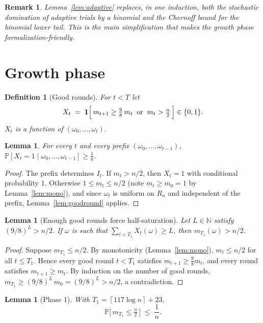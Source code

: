 \documentclass[11pt]{article}
\newtheorem{lemma}[theorem]{Lemma}
\newtheorem{definition}[theorem]{Definition}
\newtheorem{remark}[theorem]{Remark}
\renewcommand{\Pr}{\mathbb{P}}
\newcommand{\N}{\mathbb{N}}
\newcommand{\ceil}[1]{\left\lceil #1 \right\rceil}
\begin{document}
\begin{remark}
Lemma~\ref{lem:adaptive} replaces, in one induction, both the stochastic
domination of adaptive trials by a binomial and the Chernoff bound for the
binomial lower tail.  This is the main simplification that makes the growth
phase formalization-friendly.
\end{remark}

\section{Growth phase}\label{sec:growth}

\begin{definition}[Good rounds]\label{def:good}
For $t < T$ let
\[
  X_t \;=\; \mathbf{1}\Bigl[\, m_{t+1} \ge \tfrac98\, m_t
  \;\;\text{or}\;\; m_t > \tfrac n2 \,\Bigr] \in \{0,1\}.
\]
$X_t$ is a function of $(\omega_0,\dots,\omega_t)$.
\end{definition}

\begin{lemma}\label{lem:goodprob}
For every $t$ and every prefix $(\omega_0,\dots,\omega_{t-1})$,
$\Pr[X_t = 1 \mid \omega_0,\dots,\omega_{t-1}] \ge \tfrac18$.
\end{lemma}

\begin{proof}
The prefix determines $I_t$.  If $m_t > n/2$, then $X_t = 1$ with conditional
probability $1$.  Otherwise $1 \le m_t \le n/2$ (note $m_t \ge m_0 = 1$ by
Lemma~\ref{lem:mono}), and since $\omega_t$ is uniform on $R_n$ and
independent of the prefix, Lemma~\ref{lem:goodround} applies.
\end{proof}

\begin{lemma}[Enough good rounds force half-saturation]\label{lem:force}
Let $L \in \N$ satisfy $(9/8)^L > n/2$.  If $\omega$ is such that
$\sum_{t < T_1} X_t(\omega) \ge L$, then $m_{T_1}(\omega) > n/2$.
\end{lemma}

\begin{proof}
Suppose $m_{T_1} \le n/2$.  By monotonicity (Lemma~\ref{lem:mono}),
$m_t \le n/2$ for all $t \le T_1$.  Hence every good round $t < T_1$ satisfies
$m_{t+1} \ge \tfrac98 m_t$, and every round satisfies $m_{t+1} \ge m_t$.  By
induction on the number of good rounds, $m_{T_1} \ge (9/8)^{L} \, m_0 =
(9/8)^L > n/2$, a contradiction.
\end{proof}

\begin{lemma}[Phase 1]\label{lem:phase1}
With $T_1 = \ceil{117 \log n} + 23$,
\[
  \Pr\bigl[\, m_{T_1} \le \tfrac n2 \,\bigr] \;\le\; \frac1n .
\]
\end{lemma}
\end{document}
